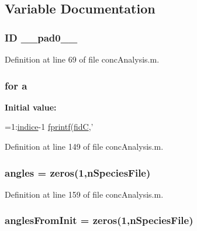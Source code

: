 \subsection{Variable Documentation}
\hypertarget{a00025_a1bd174db58293f9130ed98bb375ccc03}{
\subsubsection[{\+\_\+\+\_\+pad0\+\_\+\+\_\+}]{\setlength{\rightskip}{0pt plus 5cm}I\+D \+\_\+\+\_\+pad0\+\_\+\+\_\+}}\label{a00025_a1bd174db58293f9130ed98bb375ccc03}


Definition at line 69 of file conc\+Analysis.\+m.

\hypertarget{a00025_a230414213a9710ed03b6cf8d2695ee94}{
\subsubsection[{a}]{\setlength{\rightskip}{0pt plus 5cm}for a}}\label{a00025_a230414213a9710ed03b6cf8d2695ee94}
{\bfseries Initial value\+:}
\begin{DoxyCode}
=1:\hyperlink{a00025_a776b2bbd08be028d44f6d4260f27633a}{indice}-1
                    \hyperlink{a00027_a21172d88d238291f06b91067ea53f814}{fprintf}(\hyperlink{a00025_a5650dbe23ad9065391c1ea56f8acd34c}{fidC},'%
\end{DoxyCode}


Definition at line 149 of file conc\+Analysis.\+m.

\hypertarget{a00025_aee6c8457aab4cc643bbdaea8794ca74e}{
\subsubsection[{angles}]{\setlength{\rightskip}{0pt plus 5cm}angles = zeros(1,n\+Species\+File)}}\label{a00025_aee6c8457aab4cc643bbdaea8794ca74e}


Definition at line 159 of file conc\+Analysis.\+m.

\hypertarget{a00025_a860d662b73220f44f28099dfa9d3de76}{
\subsubsection[{angles\+From\+Init}]{\setlength{\rightskip}{0pt plus 5cm}angles\+From\+Init = zeros(1,n\+Species\+File)}}\label{a00025_a860d662b73220f44f28099dfa9d3de76}


